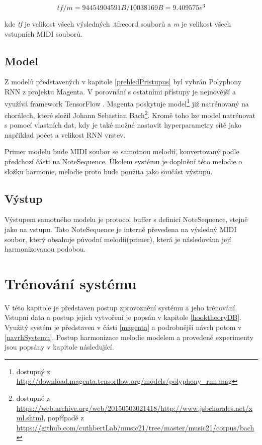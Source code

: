 $$ tf / m = 94454904591B / 10038169B = 9.409575e^3$$

kde \emph{tf} je velikost všech výsledných .tfrecord souborů 
a \emph{m} je velikost všech vstupních MIDI souborů.

\section{Model}
Z modelů představených v kapitole \ref{prehledPristupus} byl vybrán 
Polyphony RNN z projektu Magenta.
V porovnání s ostatními přístupy je nejnovější a využívá framework TensorFlow
\cite{YinCheng_comparativeStudy,google_git_polyphony}.
Magenta poskytuje model\footnote{dostupný z \url{http://download.magenta.tensorflow.org/models/polyphony_rnn.mag}} 
již natrénovaný na chorálech, které složil Johann Sebastian Bach\footnote{
dostupné z \url{https://web.archive.org/web/20150503021418/http://www.jsbchorales.net/xml.shtml}, 
popřípadě z \url{https://github.com/cuthbertLab/music21/tree/master/music21/corpus/bach}}.
Kromě toho lze model natrénovat s pomocí vlastních dat,
kdy je také možné nastavit hyperparametry sítě jako například počet a velikost RNN vrstev.
\cite{google_git_polyphony}
\par

Primer modelu bude MIDI soubor se samotnou melodií, 
konvertovaný podle předchozí části na NoteSequence.
Úkolem systému je doplnění této melodie o složku harmonie, 
melodie proto bude použita jako součást výstupu.

\section{Výstup}
Výstupem samotného modelu je protocol buffer s definicí NoteSequence, 
stejně jako na vstupu.
Tato NoteSequence je interně převedena na výsledný MIDI soubor, 
který obsahuje původní melodii(primer), která je následována její harmonizovanou podobou.
\cite{google_git_polyphony}

\chapter{Trénování systému}
\label{trenovaniModelu}
V této kapitole je představen postup zprovoznění systému a jeho trénování.
Vstupní data a postup jejich vytvoření je popsán v kapitole \ref{hooktheoryDB}.
Využitý systém je představen v části \ref{magenta} 
a podrobnější návrh potom v \ref{navrhSystemu}.
Postup harmonizace melodie modelem a provedené experimenty jsou popsány v kapitole následující.
\par

